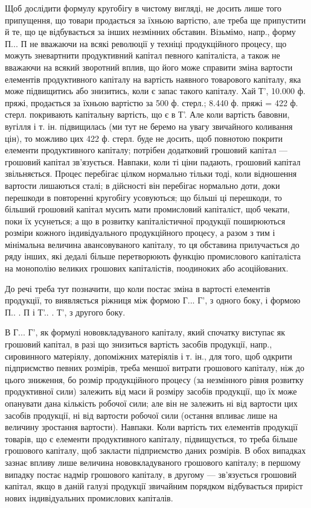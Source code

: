 Щоб дослідити формулу кругобігу в чистому вигляді, не досить лише
того припущення, що товари продається за їхньою вартістю, але треба
ще припустити й те, що це відбувається за інших незмінних обставин.
Візьмімо, напр., форму П... П не вважаючи на всякі революції у техніці
продукційного процесу, що можуть зневартнити продуктивний капітал певного
капіталіста, а також не вважаючи на всякий зворотний вплив, що
його може справити зміна вартости елементів продуктивного капіталу на
вартість наявного товарового капіталу, яка може підвищитись або
знизитись, коли є запас такого капіталу. Хай Т', 10.000 ф. пряжі,
продається за їхньою вартістю за 500 ф. стерл.; 8.440 ф. пряжі =
422 ф. стерл. покривають капітальну вартість, що є в Т'. Але коли
вартість бавовни, вугілля і т. ін. підвищилась (ми тут не беремо на увагу
звичайного коливання цін), то можливо цих 422 ф. стерл. буде не досить,
щоб повнотою покрити елементи продуктивного капіталу; потрібен додатковий
грошовий капітал — грошовий капітал зв’язується. Навпаки, коли
ті ціни падають, грошовий капітал звільняється. Процес перебігає цілком
нормально тільки тоді, коли відношення вартости лишаються сталі; в дійсності
він перебігає нормально доти, доки перешкоди в повторенні кругобігу
усовуються; що більші ці перешкоди, то більший грошовий капітал
мусить мати промисловий капіталіст, щоб чекати, поки їх усунеться; а що в
розвитку капіталістичної продукції поширюються розміри кожного індивідуального
продукційного процесу, а разом з тим і мінімальна величина
авансовуваного капіталу, то ця обставина прилучається до ряду
інших, які дедалі більше перетворюють функцію промислового капіталіста
на монополію великих грошових капіталістів, поодиноких або
асоційованих.

До речі треба тут позначити, що коли постає зміна в вартості елементів
продукції, то виявляється ріжниця між формою Г... Г', з одного
боку, і формою П.. . П і Т'.. . Т', з другого боку.

В Г... Г', як формулі нововкладуваного капіталу, який спочатку
виступає як грошовий капітал, в разі що знизиться вартість засобів
продукції, напр., сировинного матеріялу, допоміжних матеріялів і т. ін., для
того, щоб одкрити підприємство певних розмірів, треба меншої витрати
грошового капіталу, ніж до цього зниження, бо розмір продукційного
процесу (за незмінного рівня розвитку продуктивної сили) залежить від
маси й розміру засобів продукції, що їх може опанувати дана кількість
робочої сили; але він не залежить ні від вартости цих засобів продукції,
ні від вартости робочої сили (остання впливає лише на величину
зростання вартости). Навпаки. Коли вартість тих елементів продукції товарів,
що є елементи продуктивного капіталу, підвищується, то треба
більше грошового капіталу, щоб закласти підприємство даних розмірів.
В обох випадках зазнає впливу лише величина нововкладуваного грошового
капіталу; в першому випадку постає надмір грошового капіталу, в
другому — зв’язується грошовий капітал, якщо в даній галузі продукції
звичайним порядком відбувається приріст нових індивідуальних промислових
капіталів.

